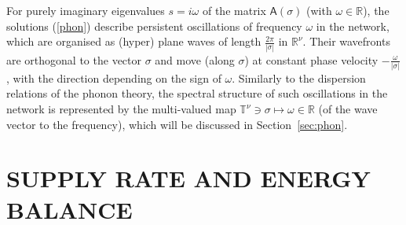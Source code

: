 \documentclass[letterpaper, 10pt, conference]{ieeeconf}  %
\def\Re{\mathrm{Re}}   %
\def\mZ{\mathbb{Z}}    %
\def\mR{\mathbb{R}}    %
\def\rT{\mathrm{T}}        %
\def\re{\mathrm{e}}        %
\def\sA{\mathsf{A}}
\def\mT{\mathbb{T}}
\def\mZ{\mathbb{Z}}
\begin{document}
For purely imaginary eigenvalues $s = i\omega$ of the matrix $\sA(\sigma)$ (with $\omega \in \mR$), the solutions (\ref{phon}) describe persistent oscillations of frequency $\omega$ in the network, which are organised as (hyper) plane waves of length $\frac{2\pi}{|\sigma|}$ in $\mR^\nu$. Their wavefronts are orthogonal to the vector $\sigma$ and move (along $\sigma$) at constant phase velocity $-\frac{\omega}{|\sigma|}$, with the direction depending on the sign of $\omega$. Similarly to the dispersion relations of the phonon theory, the spectral structure of such oscillations  in the network is represented by the multi-valued map $\mT^\nu\ni \sigma\mapsto\omega \in \mR$ (of the wave vector to the frequency), which  will be discussed in Section~\ref{sec:phon}.


\section{SUPPLY RATE AND ENERGY BALANCE%
}\label{sec:bal}
\end{document}
